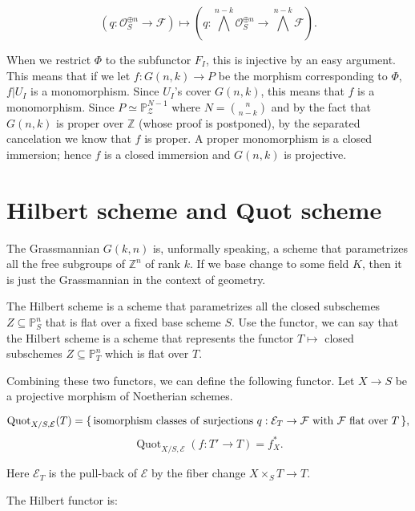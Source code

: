 \documentclass{article}
\theoremstyle{theorem}
\begin{document}
    $$\displaystyle (q : \mathcal O_S^{\oplus n} \rightarrow \mathcal F) \mapsto (q : \bigwedge^{n-k} \mathcal O_S^{\oplus n} \rightarrow \bigwedge^{n-k} \mathcal F).$$
    
    When we restrict $\Phi$ to the subfunctor $F_I$, this is injective by an easy argument. This means that if we let $f : G(n,k) \rightarrow P$ be the morphism corresponding to $\Phi$, $f|U_I$ is a monomorphism. Since $U_I$'s cover $G(n,k)$, this means that $f$ is a monomorphism. Since $P \simeq \mathbb P^{N-1}_{\mathcal Z}$ where $N = \binom{n}{n-k}$ and by the fact that $G(n,k)$ is proper over $\mathbb Z$ (whose proof is postponed), by the separated cancelation we know that $f$ is proper. A proper monomorphism is a closed immersion; hence $f$ is a closed immersion and $G(n, k)$ is projective.
    
    \section{Hilbert scheme and Quot scheme}
    The Grassmannian $G(k,n)$ is, unformally speaking, a scheme that parametrizes all the free subgroups of $\mathbb Z^n$ of rank $k$. If we base change to some field $K$, then it is just the Grassmannian in the context of geometry.
    \newline
    
    The Hilbert scheme is a scheme that parametrizes all the closed subschemes $Z \subseteq \mathbb P^n_S$ that is flat over a fixed base scheme $S$. Use the functor, we can say that the Hilbert scheme is a scheme that represents the functor $T \mapsto $ closed subschemes $Z \subseteq \mathbb P^n_T$ which is flat over $T$.
    \newline
    
    Combining these two functors, we can define the following functor. Let $X \rightarrow S$ be a projective morphism of Noetherian schemes.
    
    $$\operatorname{Quot}_{X/S, \mathcal E}(T) = \{\,{\rm isomorphism \ classes \ of \ surjections \ } q : \mathcal E_T \rightarrow \mathcal F {\rm \ with} \ \mathcal F {\rm \ flat \ over \ } T \, \},$$
    $$\operatorname{Quot}_{X/S, \mathcal E}(f : T' \rightarrow T) = f_X^*.$$
    
    Here $\mathcal E_T$ is the pull-back of $\mathcal E$ by the fiber change $X\times_ST \rightarrow T$.
    \newline
    
    The Hilbert functor is:
    
\end{document}

